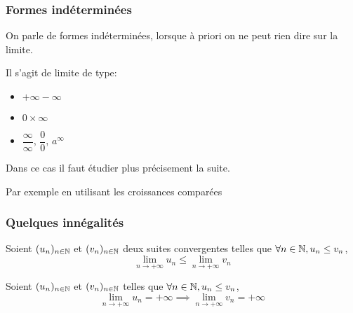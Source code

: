 \documentclass[a4paper, 12pt]{article}
\begin{document}
\subsubsection{Formes indéterminées}

On parle de formes indéterminées, lorsque à priori on ne peut rien dire sur la limite.

Il s'agit de limite de type:

\begin{itemize}
    \item $+\infty -\infty$
    \item $0 \times \infty$
    \item $\dfrac{\infty}{\infty}$, $\dfrac{0}{0}$, $a^\infty$
\end{itemize}

Dans ce cas il faut étudier plus précisement la suite.

Par exemple en utilisant les croissances comparées

\subsubsection{Quelques innégalités}

\begin{proprietes}
    \item Soient $(u_n)_{n \in \mathbb{N}}$ et $(v_n)_{n \in \mathbb{N}}$ deux suites convergentes telles que $\forall n \in \mathbb{N}, u_n \leq v_n$,
    $$
    \lim_{n \to +\infty}u_n \leq \lim_{n \to +\infty}v_n
    $$
    \item Soient $(u_n)_{n \in \mathbb{N}}$ et $(v_n)_{n \in \mathbb{N}}$ telles que $\forall n \in \mathbb{N}, u_n \leq v_n$,
    $$
    \lim_{n \to +\infty}u_n = +\infty \implies \lim_{n \to +\infty}v_n = +\infty
    $$
\end{proprietes}
\end{document}
